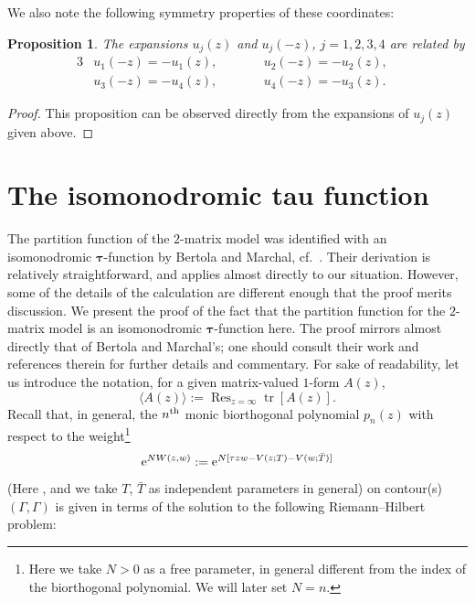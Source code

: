 \documentclass[pdftex]{sigma}
\DeclareMathOperator{\tr}{tr}
\DeclareMathOperator*{\Ress}{Res}
\newcommand{\Res}{\displaystyle\Ress}
\numberwithin{equation}{section}
\newtheorem{Proposition}[Theorem]{Proposition}
 { \theoremstyle{definition}
\newtheorem{Definition}[Theorem]{Definition}
\newtheorem{Note}[Theorem]{Note}
\newtheorem{Example}[Theorem]{Example}
\newtheorem{Remark}[Theorem]{Remark} }
\begin{document}
We also note the following symmetry properties of these coordinates:
 \begin{Proposition}
 The expansions $u_j(z)$ and $u_j(-z)$, $j=1,2,3,4$ are related by
 \begin{alignat*}{3}
 &u_1(-z) = -u_1(z), \qquad&& u_2(-z) = -u_2(z),&\\
 &u_3(-z) = -u_4(z), \qquad&& u_4(-z) = -u_3(z).&
 \end{alignat*}
 \end{Proposition}
\begin{proof}
 This proposition can be observed directly from the expansions of $u_j(z)$ given above.
\end{proof}





\section{The isomonodromic tau function} \label{Appendix-B}
 The partition function of the $2$-matrix model was identified with an isomonodromic $\boldsymbol{\tau}$-function by Bertola and Marchal,
 cf.~\cite{Bertola-Marchal}. Their derivation is relatively straightforward, and applies almost directly to our situation. However, some of
 the details of the calculation are different enough that the proof merits discussion. We present the proof of the fact
 that the partition function for the $2$-matrix model is an isomonodromic $\boldsymbol{\tau}$-function here. The proof mirrors almost directly that of
 Bertola and Marchal's; one should consult their work and references therein for further details and commentary.
 For sake of readability, let us introduce the notation, for a given matrix-valued $1$-form $A(z)$,
 \begin{equation*}
 \langle A(z) \rangle := \Res_{z=\infty} \tr [ A(z)].
 \end{equation*}
 Recall that, in general, the $n^{\rm th}$ monic biorthogonal polynomial $p_n(z)$ with respect to the weight\footnote{Here we take $N >0$ as a free parameter, in general different from the index of the biorthogonal polynomial. We will later set $N=n$.}
 \begin{equation*}
 {\rm e}^{N W(z,w)} := {\rm e}^{N[\tau zw - V(z;T) - V(w;\bar{T})]}
 \end{equation*}
 \big(Here , and we take $T$, $\bar{T}$ as independent parameters in general\big) on contour(s) $(\Gamma,\Gamma)$
 is given in terms of the solution to the following Riemann--Hilbert problem:
\end{document}
